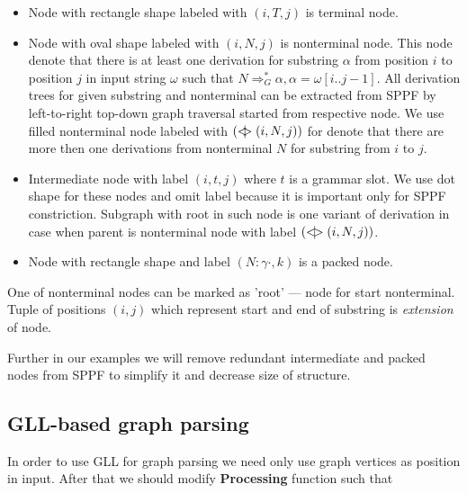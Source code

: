 \begin{itemize}
    \item Node with rectangle shape labeled with $(i, T, j)$ is terminal node.     
    \item Node with oval shape labeled with $(i, N, j)$ is nonterminal node. 
    This node denote that there is at least one derivation for substring $\alpha$ from position $i$ to position $j$ in input string $\omega$ such that $N \Rightarrow^*_G \alpha, \alpha = \omega[i..j-1] $.
    All derivation trees for given substring and nonterminal can be extracted from SPPF by left-to-right top-down graph traversal started from respective node. 
    We use filled nonterminal node labeled with $(<\mkern-11mu | \mkern-11mu> (i, N, j))$ for denote that there are more then one derivations from nonterminal $N$ for substring from $i$ to $j$.
    \item Intermediate node with label $(i,t,j)$ where $t$ is a grammar slot. We use dot shape for these nodes and omit label because it is important only for SPPF constriction.
	Subgraph with root in such node is one variant of derivation in case when parent is nonterminal node with label $(<\mkern-9mu | \mkern-9mu> (i, N, j))$.
    \item Node with rectangle shape and label $(N : \gamma \cdot, k)$ is a packed node.
\end{itemize}
One of nonterminal nodes can be marked as 'root' --- node for start nonterminal. Tuple of positions $(i,j)$ which represent start and end of substring is \textit{extension} of node.

Further in our examples we will remove redundant intermediate and packed nodes from SPPF to simplify it and decrease size of structure.

\subsection{GLL-based graph parsing}
In order to use GLL for graph parsing we need only use graph vertices as position in input. After that we should modify \textbf{Processing} function such that 

